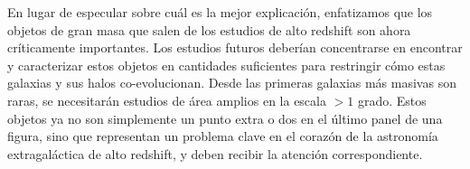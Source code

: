 \documentclass{article}
\begin{document}
En lugar de especular sobre cuál es la mejor explicación, enfatizamos que los objetos de gran masa que salen de los estudios de alto redshift son ahora críticamente importantes. Los estudios futuros deberían concentrarse en encontrar y caracterizar estos objetos en cantidades suficientes para restringir cómo estas galaxias y sus halos co-evolucionan. Desde las primeras galaxias más masivas son raras, se necesitarán estudios de área amplios en la escala $> 1$ grado. Estos objetos ya no son simplemente un punto extra o dos en el último panel de una figura, sino que representan un problema clave en el corazón de la astronomía extragaláctica de alto redshift, y deben recibir la atención correspondiente.
\newpage



\newpage
\appendix

\end{document}
